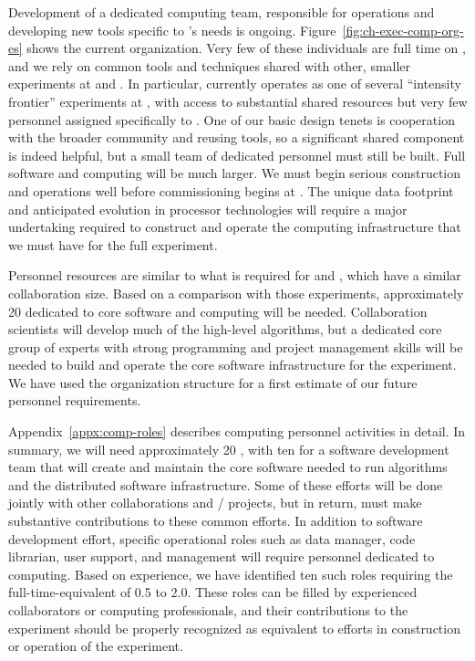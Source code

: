 Development of a  dedicated  computing team, responsible for operations and developing new tools specific to 's needs is ongoing. 
Figure~\ref{fig:ch-exec-comp-org-es} shows the current organization.  Very few of these individuals are full time on , and we rely on common tools and techniques shared with other, smaller experiments at  and . In particular,  currently operates as one of several ``intensity frontier'' experiments at , with access to substantial shared resources but very few personnel assigned specifically to .  One of our basic design tenets is cooperation with the broader community and reusing tools, so a significant shared component is indeed helpful, but a small team of dedicated personnel must still be built. 
Full  software and computing will be much larger. We must begin serious construction and operations well before commissioning begins at . The unique  data footprint and anticipated evolution in processor technologies will require a major undertaking required to construct and operate the computing infrastructure that we must have for the full experiment.

Personnel resources are similar to what is required for  and , which have a similar collaboration size.  Based on a comparison with those experiments, approximately 20  dedicated to core software and computing will be needed.  
Collaboration scientists will develop much of the high-level algorithms, but a dedicated core group of experts with strong programming and project management skills will be needed to build and operate the core software infrastructure for the experiment.  We have used the  organization structure for a first estimate of our future personnel requirements.


Appendix~\ref{appx:comp-roles} describes computing personnel activities in detail.  In summary, we will need approximately 20 , with  ten  for a software development team that will create and maintain the core software needed to run  algorithms and the distributed software infrastructure.  Some of these efforts  will be done jointly with other collaborations and / projects, but in return,  must make substantive contributions to these common efforts. In addition to software development effort,%
specific operational roles such as data manager, code librarian, user support, and management %
will require personnel dedicated to  computing. Based on  experience, we have identified ten such roles 
requiring the full-time-equivalent  of 0.5 to 2.0.  These roles can be filled by experienced  collaborators or computing professionals, and their contributions to the experiment should be properly recognized as equivalent to efforts in construction or operation of the experiment. 



